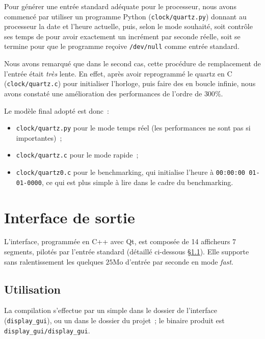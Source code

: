 \documentclass[11pt,a4paper]{article}
\newcommand{\relire}{}
\newcommand{\relu}[1]{}
\begin{document}
Pour générer une entrée standard adéquate pour le processeur, nous avons commencé par utiliser un programme Python (\texttt{clock/quartz.py}) donnant au processeur la date et l'heure actuelle, puis, selon le mode souhaité, soit contrôle ses temps de  pour avoir exactement un incrément par seconde réelle, soit se termine pour que le programme reçoive \texttt{/dev/null} comme entrée standard.

Nous avons remarqué que dans le second cas, cette procédure de remplacement de l'entrée était \emph{très} lente. En effet, après avoir reprogrammé le quartz en C (\texttt{clock/quartz.c}) pour initialiser l'horloge, puis faire des  en boucle infinie, nous avons constaté une amélioration des performances de l'ordre de $300\%$.

Le modèle final adopté est donc~:
\begin{itemize}
\item \texttt{clock/quartz.py} pour le mode temps réel (les performances ne sont pas si importantes)~;
\item \texttt{clock/quartz.c} pour le mode rapide~;
\item \texttt{clock/quartz0.c} pour le benchmarking, qui initialise l'heure à \verb!00:00:00 01-01-0000!, ce qui est plus simple à lire dans le cadre du benchmarking.
\end{itemize}

\section{Interface de sortie} \label{sec:gui}

\relire \relu{Théo}
\relu{Nathanaël} \relu{No}

L'interface, programmée en C++ avec Qt, est composée de 14 afficheurs 7 segments, pilotés par l'entrée standard (détaillé ci-dessous §\ref{ssec:gui_use}). Elle supporte sans ralentissement les quelques $25\text{Mo}$ d'entrée par seconde en mode \emph{fast}.

\subsection{Utilisation} \label{ssec:gui_use}

La compilation s'effectue par un simple  dans le dossier de l'interface (\texttt{display\_gui}), ou un  dans le dossier du projet~; le binaire produit est \texttt{display\_gui/display\_gui}.
\end{document}
